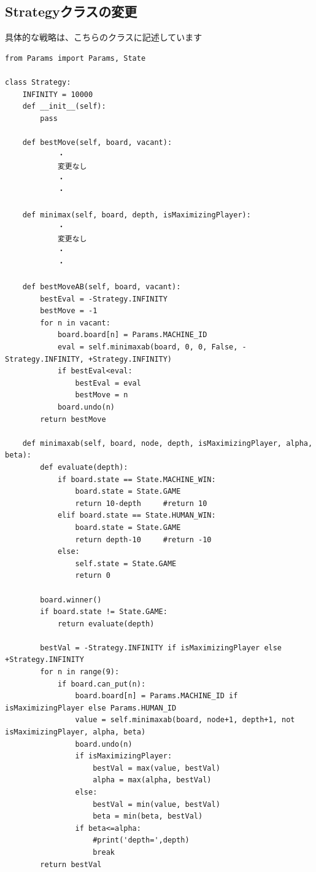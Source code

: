 \documentclass[uplatex,a4paper,11pt,oneside,openany]{jsbook}
\begin{document}
\subsection{Strategyクラスの変更}

具体的な戦略は、こちらのクラスに記述しています

\begin{lstlisting}[caption=class Strategy,label=minimax00]
from Params import Params, State

class Strategy:
    INFINITY = 10000
    def __init__(self):
        pass

    def bestMove(self, board, vacant):
            ・
            変更なし
            ・
            ・

    def minimax(self, board, depth, isMaximizingPlayer):
            ・
            変更なし
            ・
            ・

    def bestMoveAB(self, board, vacant):
        bestEval = -Strategy.INFINITY
        bestMove = -1
        for n in vacant:
            board.board[n] = Params.MACHINE_ID
            eval = self.minimaxab(board, 0, 0, False, -Strategy.INFINITY, +Strategy.INFINITY)
            if bestEval<eval:
                bestEval = eval
                bestMove = n
            board.undo(n)
        return bestMove

    def minimaxab(self, board, node, depth, isMaximizingPlayer, alpha, beta):
        def evaluate(depth):
            if board.state == State.MACHINE_WIN:
                board.state = State.GAME
                return 10-depth     #return 10
            elif board.state == State.HUMAN_WIN:
                board.state = State.GAME
                return depth-10     #return -10
            else:
                self.state = State.GAME
                return 0

        board.winner()
        if board.state != State.GAME:
            return evaluate(depth)

        bestVal = -Strategy.INFINITY if isMaximizingPlayer else +Strategy.INFINITY
        for n in range(9):
            if board.can_put(n):
                board.board[n] = Params.MACHINE_ID if isMaximizingPlayer else Params.HUMAN_ID
                value = self.minimaxab(board, node+1, depth+1, not isMaximizingPlayer, alpha, beta)
                board.undo(n)
                if isMaximizingPlayer:
                    bestVal = max(value, bestVal)
                    alpha = max(alpha, bestVal)
                else:
                    bestVal = min(value, bestVal)
                    beta = min(beta, bestVal)
                if beta<=alpha:
                    #print('depth=',depth)
                    break
        return bestVal
\end{lstlisting}
\end{document}

